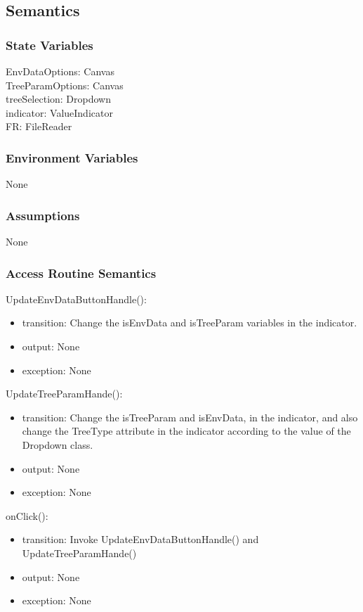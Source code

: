\documentclass[12pt, titlepage]{article}
\begin{document}
\subsection{Semantics}
\subsubsection{State Variables}
 EnvDataOptions: Canvas\\
 TreeParamOptions: Canvas\\
 treeSelection: Dropdown\\
 indicator: ValueIndicator\\
 FR: FileReader

\subsubsection{Environment Variables}
None

\subsubsection{Assumptions}
None

\subsubsection{Access Routine Semantics}
UpdateEnvDataButtonHandle():
\begin{itemize}
\item transition: Change the isEnvData and isTreeParam variables in the indicator. 
\item output: None
\item exception: None
\end{itemize}
UpdateTreeParamHande():
\begin{itemize}
\item transition: Change the isTreeParam and isEnvData, in the indicator, and also change the TreeType attribute in the indicator according to the value of the Dropdown class. 
\item output: None
\item exception: None
\end{itemize}
onClick():
\begin{itemize}
\item transition: Invoke UpdateEnvDataButtonHandle() and UpdateTreeParamHande()
\item output: None
\item exception: None
\end{itemize}
\end{document}
